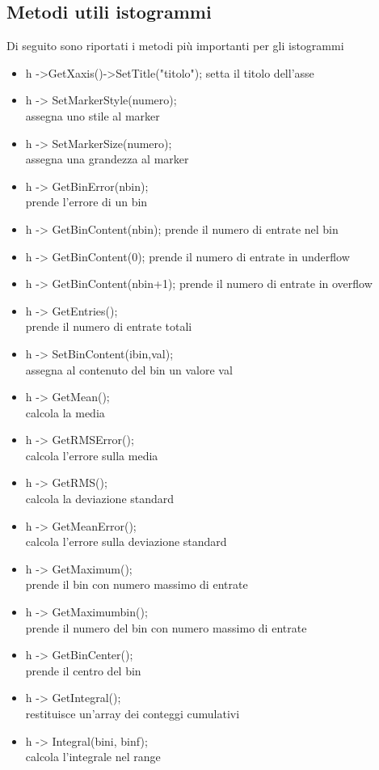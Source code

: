 \documentclass[10pt,a4paper]{article}
\begin{document}
\subsection{Metodi utili istogrammi}
Di seguito sono riportati i metodi più importanti per gli istogrammi
\begin{itemize}
	\item h ->GetXaxis()->SetTitle("titolo");
	setta il titolo dell'asse
	\item h -> SetMarkerStyle(numero);\\
	assegna uno stile al marker
	\item h -> SetMarkerSize(numero);\\
	assegna una grandezza al marker
	\item h -> GetBinError(nbin);\\
	prende l'errore di un bin
	\item h -> GetBinContent(nbin);
	prende il numero di entrate nel bin
	\item h -> GetBinContent(0);
	prende il numero di entrate in underflow
	\item h -> GetBinContent(nbin+1);
	prende il numero di entrate in overflow
	\item h -> GetEntries();\\
	prende il numero di entrate totali
	\item h -> SetBinContent(ibin,val);\\
	assegna al contenuto del bin un valore val
	\item h -> GetMean();\\
	calcola la media
	\item h -> GetRMSError();\\
	calcola l'errore sulla media
	\item h -> GetRMS();\\
	calcola la deviazione standard
	\item h -> GetMeanError();\\
	calcola l'errore sulla deviazione standard
	\item h -> GetMaximum();\\
	prende il bin con numero massimo di entrate
	\item h -> GetMaximumbin();\\
	prende il numero del bin con numero massimo di entrate
	\item h -> GetBinCenter();\\
	prende il centro del bin
	\item h -> GetIntegral();\\
	restituisce un'array dei conteggi cumulativi 
	\item h -> Integral(bini, binf);\\
	calcola l'integrale nel range
\end{itemize}
\end{document}
